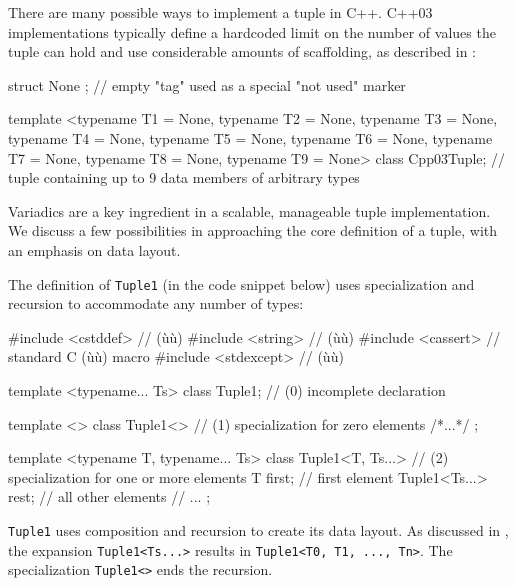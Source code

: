 There are many possible ways to implement a tuple in C++. C++03
implementations typically define a hardcoded limit on the number of
values the tuple can hold and use considerable amounts of scaffolding,
as described in :

\begin{emcppslisting}
struct None { };  // empty "tag" used as a special "not used" marker

template <typename T1 = None, typename T2 = None, typename T3 = None,
          typename T4 = None, typename T5 = None, typename T6 = None,
          typename T7 = None, typename T8 = None, typename T9 = None>
class Cpp03Tuple;
    // tuple containing up to 9 data members of arbitrary types
\end{emcppslisting}
    

\noindent Variadics are a key ingredient in a scalable, manageable tuple
implementation. We discuss a few possibilities in approaching the core
definition of a tuple, with an emphasis on data layout.

The definition of \lstinline!Tuple1! (in the code snippet below) uses
specialization and recursion to accommodate any number of types:

\begin{emcppshiddenlisting}[emcppsbatch=e37,emcppsstandards={c++14}]
#include <cstddef>  // (ù{}ù)
#include <string>   // (ù{}ù)
#include <cassert>  // standard C (ù{}ù) macro
#include <stdexcept>  // (ù{}ù)
\end{emcppshiddenlisting}
\begin{emcppslisting}[emcppsbatch=e37]
template <typename... Ts>
class Tuple1;                // (0) incomplete declaration

template <>
class Tuple1<>               // (1) specialization for zero elements
{ /*...*/ };

template <typename T, typename... Ts>
class Tuple1<T, Ts...>       // (2) specialization for one or more elements
{
    T first;                 // first element
    Tuple1<Ts...> rest;      // all other elements
    // ...
};
\end{emcppslisting}
    

\noindent \lstinline!Tuple1! uses composition and recursion to create its data
layout. As discussed in , the expansion \lstinline!Tuple1<Ts...>! results in\linebreak%
\lstinline!Tuple1<T0,!~\lstinline!T1,!~\lstinline!...,!~\lstinline!Tn>!. The
specialization \lstinline!Tuple1<>! ends the recursion.

